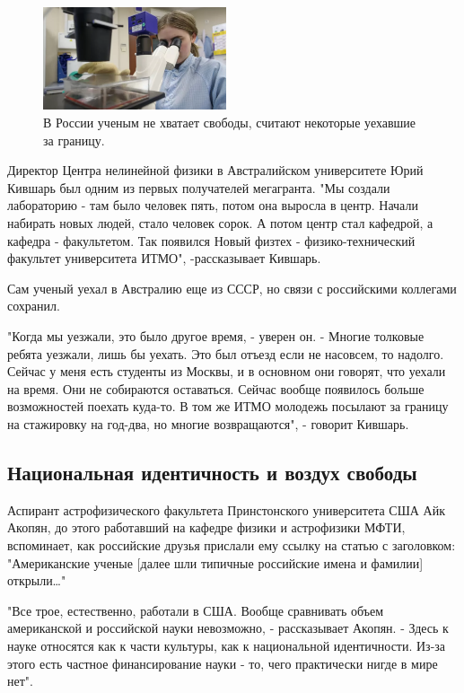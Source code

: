\begin{figure}
    \begin{center}
        \includegraphics[width=0.48\textwidth]{img/microscope.png}
    \end{center}
    \caption{В России ученым не хватает свободы, считают некоторые уехавшие за границу.}
\end{figure}
Директор Центра нелинейной физики в Австралийском университете Юрий Кившарь был одним из первых получателей мегагранта. "Мы создали лабораторию - там было человек пять, потом она выросла в центр. Начали набирать новых людей, стало человек сорок. А потом центр стал кафедрой, а кафедра - факультетом. Так появился Новый физтех - физико-технический факультет университета ИТМО", -рассказывает Кившарь.

Сам ученый уехал в Австралию еще из СССР, но связи с российскими коллегами сохранил.

"Когда мы уезжали, это было другое время, - уверен он. - Многие толковые ребята уезжали, лишь бы уехать. Это был отъезд если не насовсем, то надолго. Сейчас у меня есть студенты из Москвы, и в основном они говорят, что уехали на время. Они не собираются оставаться. Сейчас вообще появилось больше возможностей поехать куда-то. В том же ИТМО молодежь посылают за границу на стажировку на год-два, но многие возвращаются", - говорит Кившарь.

\subsection{Национальная идентичность и воздух свободы}

Аспирант астрофизического факультета Принстонского университета США Айк Акопян, до этого работавший на кафедре физики и астрофизики МФТИ, вспоминает, как российские друзья прислали ему ссылку на статью с заголовком: "Американские ученые [далее шли типичные российские имена и фамилии] открыли…"

"Все трое, естественно, работали в США. Вообще сравнивать объем американской и российской науки невозможно, - рассказывает Акопян. - Здесь к науке относятся как к части культуры, как к национальной идентичности. Из-за этого есть частное финансирование науки - то, чего практически нигде в мире нет".


